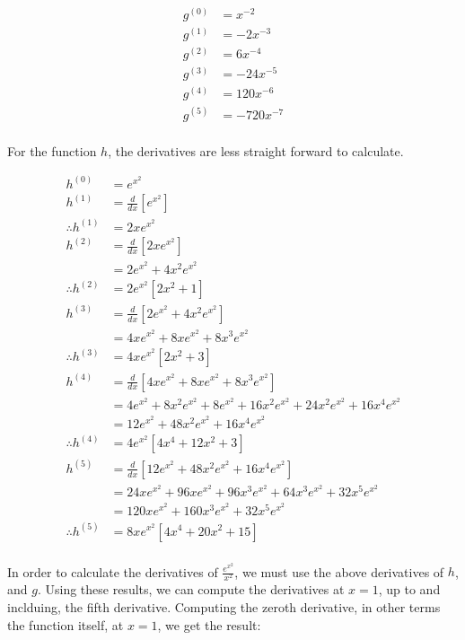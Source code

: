 \documentclass[a4paper]{article}
\begin{document}
\begin{enumerate}[label=\textbf{\arabic*.}]
\begin{enumerate}
		\begin{align*}
		g^{(0)} & = x^{-2}\\
		g^{(1)} & = -2x^{-3}\\
		g^{(2)} & = 6x^{-4}\\
		g^{(3)} & = -24x^{-5}\\
		g^{(4)} & = 120x^{-6}\\
		g^{(5)} & = -720x^{-7}\\
		\end{align*}

		\pagebreak

		For the function $h$, the derivatives are less straight forward to calculate.

		\begin{align*}
		h^{(0)} & = e^{x^2}\\[15pt]
		h^{(1)} & = \frac{d}{dx}\left[e^{x^2}\right]\\
		\therefore h^{(1)} & = 2xe^{x^2}\\[15pt]
		h^{(2)} & = \frac{d}{dx}\left[2xe^{x^2}\right]\\
		& = 2e^{x^2} + 4x^2e^{x^2}\\
		\therefore h^{(2)} & = 2e^{x^2}\left[2x^2 + 1\right]\\[15pt]
		h^{(3)} & = \frac{d}{dx}\left[2e^{x^2} + 4x^2e^{x^2}\right]\\
		& = 4xe^{x^2} + 8xe^{x^2} + 8x^3e^{x^2}\\
		\therefore h^{(3)} & = 4xe^{x^2}\left[2x^2 + 3\right]\\[15pt]
		h^{(4)} & = \frac{d}{dx}\left[4xe^{x^2} + 8xe^{x^2} + 8x^3e^{x^2}\right]\\
		& = 4e^{x^2} + 8x^2e^{x^2} + 8e^{x^2} + 16x^2e^{x^2} + 24x^2e^{x^2} + 16x^4e^{x^2}\\
		& = 12e^{x^2} + 48x^2e^{x^2} + 16x^4e^{x^2}\\
		\therefore h^{(4)} & = 4e^{x^2}\left[4x^4 + 12x^2 + 3\right]\\[15pt]
		h^{(5)} & = \frac{d}{dx}\left[12e^{x^2} + 48x^2e^{x^2} + 16x^4e^{x^2}\right]\\
		& = 24xe^{x^2} + 96xe^{x^2} + 96x^3e^{x^2} + 64x^3e^{x^2} + 32x^5e^{x^2}\\
		& = 120xe^{x^2} + 160x^3e^{x^2} + 32x^5e^{x^2}\\
		\therefore h^{(5)} & = 8xe^{x^2}\left[4x^4 + 20x^2 + 15\right]\\
		\end{align*}

		In order to calculate the derivatives of $\displaystyle{\frac{e^{x^2}}{x^2}}$, we must use the above derivatives of $h$, and $g$. Using these results, we can compute the derivatives at $x=1$, up to and inclduing, the fifth derivative. Computing the zeroth derivative, in other terms the function itself, at $x=1$, we get the result:


\end{enumerate}
\end{enumerate}
\end{document}
